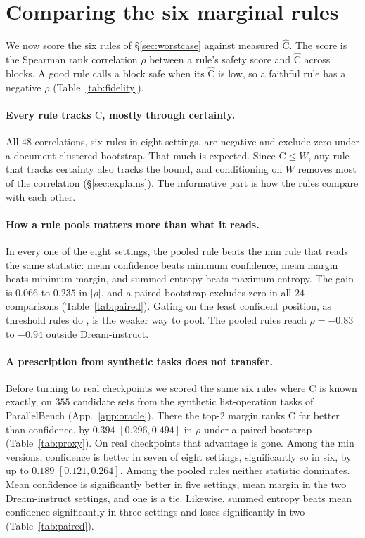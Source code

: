 \documentclass{article}
\newcommand{\C}{\mathrm{C}}
\newcommand{\Chat}{\widehat{\C}}
\begin{document}


\section{Comparing the six marginal rules}
\label{sec:fidelity}

We now score the six rules of \S\ref{sec:worstcase} against measured $\Chat$. The score
is the Spearman rank correlation $\rho$ between a rule's safety score and $\Chat$ across
blocks. A good rule calls a block safe when its $\Chat$ is low, so a faithful rule has a
negative $\rho$ (Table~\ref{tab:fidelity}).

\paragraph{Every rule tracks $\Chat$, mostly through certainty.} All $48$ correlations,
six rules in eight settings, are negative and exclude zero under a document-clustered
bootstrap. That much is expected. Since $\C\le W$, any rule that tracks certainty also
tracks the bound, and conditioning on $W$ removes most of the correlation
(\S\ref{sec:explains}). The informative part is how the rules compare with each other.

\paragraph{How a rule pools matters more than what it reads.} In every one of the eight
settings, the pooled rule beats the min rule that reads the same statistic: mean
confidence beats minimum confidence, mean margin beats minimum margin, and summed
entropy beats maximum entropy. The gain is $0.066$ to $0.235$ in $|\rho|$, and a paired
bootstrap excludes zero in all $24$ comparisons (Table~\ref{tab:paired}). Gating on the
least confident position, as threshold rules do \cite{fastdllm,dynamicdllm}, is the
weaker way to pool. The pooled rules reach $\rho=-0.83$ to $-0.94$ outside
Dream-instruct.

\paragraph{A prescription from synthetic tasks does not transfer.}
\label{sec:oracle}
Before turning to real checkpoints we scored the same six rules where $\C$ is known
exactly, on $355$ candidate sets from the synthetic list-operation tasks of ParallelBench
\cite{parallelbench} (App.~\ref{app:oracle}). There the top-2 margin ranks $\C$ far
better than confidence, by $0.394$ $[0.296,0.494]$ in $\rho$ under a paired bootstrap
(Table~\ref{tab:proxy}). On real checkpoints that advantage is gone. Among the min
versions, confidence is better in seven of eight settings, significantly so in six, by
up to $0.189$ $[0.121,0.264]$. Among the pooled rules neither statistic dominates. Mean
confidence is significantly better in five settings, mean margin in the two
Dream-instruct settings, and one is a tie. Likewise, summed entropy beats mean
confidence significantly in three settings and loses significantly in two
(Table~\ref{tab:paired}).
\end{document}

